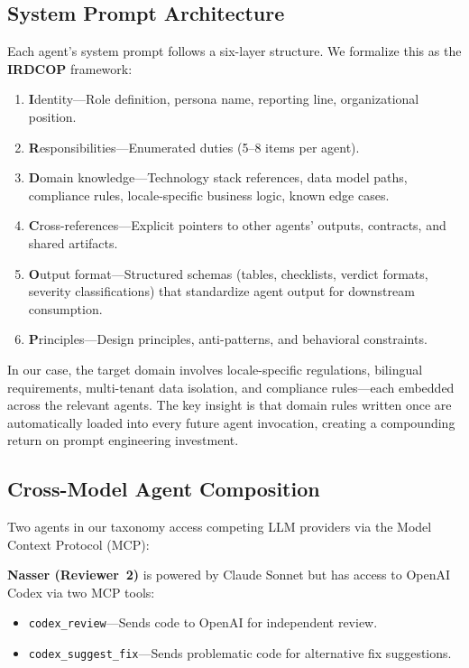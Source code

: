 \documentclass[11pt,a4paper]{article}
\begin{document}
\subsection{System Prompt Architecture}
\label{sec:promptarch}

Each agent's system prompt follows a six-layer structure. We formalize this as the \textbf{IRDCOP} framework:

\begin{enumerate}
    \item \textbf{I}dentity---Role definition, persona name, reporting line, organizational position.
    \item \textbf{R}esponsibilities---Enumerated duties (5--8 items per agent).
    \item \textbf{D}omain knowledge---Technology stack references, data model paths, compliance rules, locale-specific business logic, known edge cases.
    \item \textbf{C}ross-references---Explicit pointers to other agents' outputs, contracts, and shared artifacts.
    \item \textbf{O}utput format---Structured schemas (tables, checklists, verdict formats, severity classifications) that standardize agent output for downstream consumption.
    \item \textbf{P}rinciples---Design principles, anti-patterns, and behavioral constraints.
\end{enumerate}

In our case, the target domain involves locale-specific regulations, bilingual requirements, multi-tenant data isolation, and compliance rules---each embedded across the relevant agents. The key insight is that domain rules written once are automatically loaded into every future agent invocation, creating a compounding return on prompt engineering investment.

\subsection{Cross-Model Agent Composition}
\label{sec:crossmodel}

Two agents in our taxonomy access competing LLM providers via the Model Context Protocol (MCP):

\textbf{Nasser (Reviewer~2)} is powered by Claude Sonnet but has access to OpenAI Codex via two MCP tools:
\begin{itemize}[leftmargin=*]
    \item \texttt{codex\_review}---Sends code to OpenAI for independent review.
    \item \texttt{codex\_suggest\_fix}---Sends problematic code for alternative fix suggestions.
\end{itemize}
\end{document}
